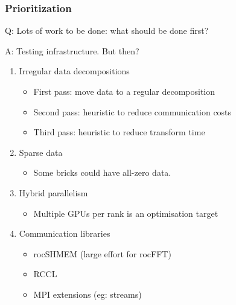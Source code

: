 \documentclass[10pt,aspectratio=169]{beamer}
\begin{document}
\begin{frame}
  \frametitle{Prioritization}

  \begin{center}
    Q: Lots of work to be done: what should be done first?
  \end{center}

  \pause
  
  \begin{center}
    A: Testing infrastructure.  \pause But then?
  \end{center}

  \pause
  
  \begin{enumerate}
  \item Irregular data decompositions
    \begin{itemize}
    \item First pass: move data to a regular decomposition
    \item Second pass: heuristic to reduce communication costs
    \item Third pass: heuristic to reduce transform time
    \end{itemize}
  \item Sparse data
    \begin{itemize}
    \item Some bricks could have all-zero data.
    \end{itemize}
  \item Hybrid parallelism
    \begin{itemize}
    \item Multiple GPUs per rank is an optimisation target
    \end{itemize}
  \item Communication libraries
    \begin{itemize}
    \item rocSHMEM (large effort for rocFFT)
    \item RCCL
    \item MPI extensions (eg: streams)
    \end{itemize}
  \end{enumerate}
  
\end{frame}
\end{document}
